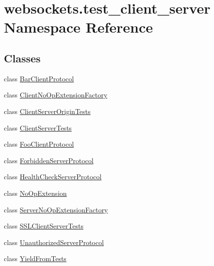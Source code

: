 \hypertarget{namespacewebsockets_1_1test__client__server}{}\section{websockets.\+test\+\_\+client\+\_\+server Namespace Reference}
\label{namespacewebsockets_1_1test__client__server}
\subsection*{Classes}
\begin{DoxyCompactItemize}
\item 
class \hyperlink{classwebsockets_1_1test__client__server_1_1_bar_client_protocol}{Bar\+Client\+Protocol}
\item 
class \hyperlink{classwebsockets_1_1test__client__server_1_1_client_no_op_extension_factory}{Client\+No\+Op\+Extension\+Factory}
\item 
class \hyperlink{classwebsockets_1_1test__client__server_1_1_client_server_origin_tests}{Client\+Server\+Origin\+Tests}
\item 
class \hyperlink{classwebsockets_1_1test__client__server_1_1_client_server_tests}{Client\+Server\+Tests}
\item 
class \hyperlink{classwebsockets_1_1test__client__server_1_1_foo_client_protocol}{Foo\+Client\+Protocol}
\item 
class \hyperlink{classwebsockets_1_1test__client__server_1_1_forbidden_server_protocol}{Forbidden\+Server\+Protocol}
\item 
class \hyperlink{classwebsockets_1_1test__client__server_1_1_health_check_server_protocol}{Health\+Check\+Server\+Protocol}
\item 
class \hyperlink{classwebsockets_1_1test__client__server_1_1_no_op_extension}{No\+Op\+Extension}
\item 
class \hyperlink{classwebsockets_1_1test__client__server_1_1_server_no_op_extension_factory}{Server\+No\+Op\+Extension\+Factory}
\item 
class \hyperlink{classwebsockets_1_1test__client__server_1_1_s_s_l_client_server_tests}{S\+S\+L\+Client\+Server\+Tests}
\item 
class \hyperlink{classwebsockets_1_1test__client__server_1_1_unauthorized_server_protocol}{Unauthorized\+Server\+Protocol}
\item 
class \hyperlink{classwebsockets_1_1test__client__server_1_1_yield_from_tests}{Yield\+From\+Tests}
\end{DoxyCompactItemize}
